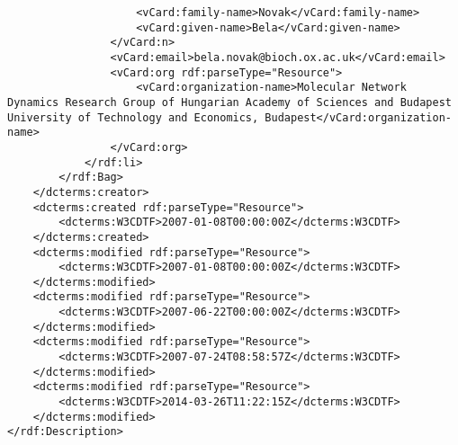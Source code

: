 \begin{mdframed}[style=mddefault,frametitle={Meta Data of the Publication \tt{Calzone2007.pdf}}]
\begin{verbatim}
					<vCard:family-name>Novak</vCard:family-name>
					<vCard:given-name>Bela</vCard:given-name>
				</vCard:n>
				<vCard:email>bela.novak@bioch.ox.ac.uk</vCard:email>
				<vCard:org rdf:parseType="Resource">
					<vCard:organization-name>Molecular Network Dynamics Research Group of Hungarian Academy of Sciences and Budapest University of Technology and Economics, Budapest</vCard:organization-name>
				</vCard:org>
			</rdf:li>
		</rdf:Bag>
	</dcterms:creator>
	<dcterms:created rdf:parseType="Resource">
		<dcterms:W3CDTF>2007-01-08T00:00:00Z</dcterms:W3CDTF>
	</dcterms:created>
	<dcterms:modified rdf:parseType="Resource">
		<dcterms:W3CDTF>2007-01-08T00:00:00Z</dcterms:W3CDTF>
	</dcterms:modified>
	<dcterms:modified rdf:parseType="Resource">
		<dcterms:W3CDTF>2007-06-22T00:00:00Z</dcterms:W3CDTF>
	</dcterms:modified>
	<dcterms:modified rdf:parseType="Resource">
		<dcterms:W3CDTF>2007-07-24T08:58:57Z</dcterms:W3CDTF>
	</dcterms:modified>
	<dcterms:modified rdf:parseType="Resource">
		<dcterms:W3CDTF>2014-03-26T11:22:15Z</dcterms:W3CDTF>
	</dcterms:modified>
</rdf:Description>
\end{verbatim}
\end{mdframed}
